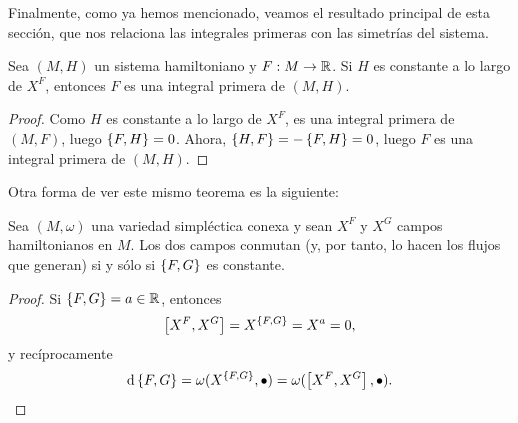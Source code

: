 Finalmente, como ya hemos mencionado, veamos el resultado principal de esta sección, que nos relaciona las integrales primeras con las simetrías del sistema.
  \begin{prop}
    Sea $(M,H)$ un sistema hamiltoniano y $F:M \rightarrow \mathbb{R}$. Si $H$ es constante a lo largo de $X^F$, entonces $F$ es una integral primera de $(M,H)$. 
  \end{prop}
  \begin{proof}
    Como $H$ es constante a lo largo de $X^F$, es una integral primera de $(M,F)$, luego $\left\lbrace F,H\right\rbrace=0$. Ahora, $\left\lbrace H,F\right\rbrace=-\left\lbrace F,H\right\rbrace=0$, luego $F$ es una integral primera de $(M,H)$. 
  \end{proof}
Otra forma de ver este mismo teorema es la siguiente:
\begin{prop}
  Sea $(M,\omega)$ una variedad simpléctica conexa y sean $X^F$ y $X^G$ campos hamiltonianos en $M$. Los dos campos conmutan (y, por tanto, lo hacen los flujos que generan) si y sólo si $\left\lbrace F,G\right\rbrace$ es constante. 
\end{prop}
\begin{proof}
  Si $\left\lbrace F,G\right\rbrace=a \in \mathbb{R}$, entonces
  \begin{equation*}
    \left[X^F,X^G\right]= X^{\left\lbrace F,G\right\rbrace} = X^a=0,
  \end{equation*}
  y recíprocamente
  \begin{equation*}
    \mathrm{d}\left\lbrace F,G\right\rbrace=\omega(X^{\left\lbrace F,G\right\rbrace},\bullet)=\omega(\left[X^F,X^G\right],\bullet).
  \end{equation*}
\end{proof}
